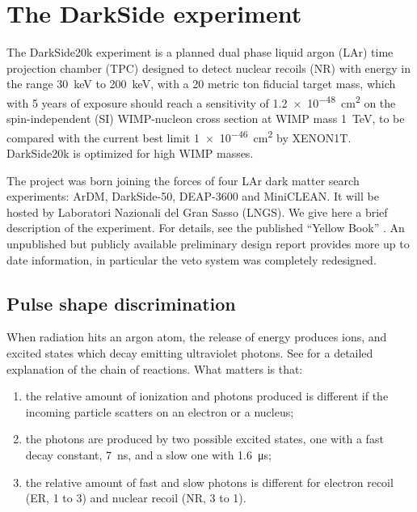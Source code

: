 \chapter{The DarkSide experiment}
\label{ch:darkside}

The DarkSide20k experiment is a planned dual phase liquid argon (LAr) time
projection chamber (TPC) designed to detect nuclear recoils (NR) with energy in
the range \SI{30}{keV} to \SI{200}{keV}, with a 20 metric ton fiducial target
mass, which with 5 years of exposure should reach a sensitivity of
\SI{1.2e-48}{cm^2} on the spin-independent (SI) WIMP-nucleon cross section at
WIMP mass \SI{1}{TeV}, to be compared with the current best limit
\SI{1e-46}{cm^2} by XENON1T. DarkSide20k is optimized for high WIMP masses.

The project was born joining the forces of four LAr dark matter search
experiments: ArDM, DarkSide-50, DEAP-3600 and MiniCLEAN. It will be hosted by
Laboratori Nazionali del Gran Sasso (LNGS). We give here a brief description of
the experiment. For details, see the published ``Yellow Book''
\cite{aalseth2018}. An unpublished but publicly available preliminary design
report \cite{aalseth2019} provides more up to date information, in particular
the veto system was completely redesigned.

\section{Pulse shape discrimination}

When radiation hits an argon atom, the release of energy produces ions, and
excited states which decay emitting ultraviolet photons. See
\cite[sec.~3.1]{luzzi2020} for a detailed explanation of the chain of
reactions. What matters is that:
%
\begin{enumerate}
    
    \item the relative amount of ionization and photons produced is different
    if the incoming particle scatters on an electron or a nucleus;
    
    \item the photons are produced by two possible excited states, one with
    a fast decay constant, \SI{7}{ns}, and a slow one with \SI{1.6}{\micro s};
    
    \item the relative amount of fast and slow photons is different for
    electron recoil (ER, 1 to 3) and nuclear recoil (NR, 3 to 1).
    
\end{enumerate}


